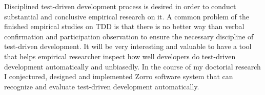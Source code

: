 Disciplined test-driven development process is desired in order to conduct
substantial and conclusive empirical research on it. A common problem of
the finished empirical studies on TDD is that there is no better way than
verbal confirmation and participation observation to ensure the necessary
discipline of test-driven development. It will be very interesting and
valuable to have a tool that helps empirical researcher inspect how well
developers do test-driven development automatically and unbiasedly. In the
course of my doctorial research I conjectured, designed and implemented
Zorro software system that can recognize and evaluate test-driven
development automatically.

